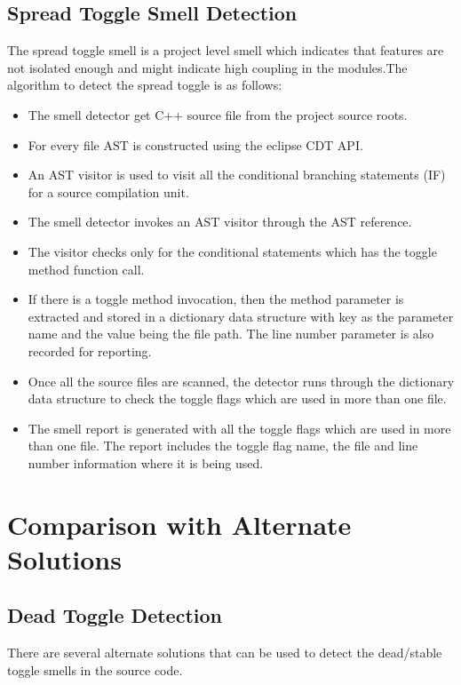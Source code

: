 \documentclass[conference]{IEEEtran}
\begin{document}
\subsection{Spread Toggle Smell Detection}
The spread toggle smell is a project level smell which indicates that features are not isolated enough and might indicate high coupling in the modules.The algorithm to detect the spread toggle is as follows: 
\begin{itemize}
	\item The smell detector get C++ source file from the project source roots.
	\item For every file AST is constructed using the eclipse CDT API.
	\item An AST visitor is used to visit all the conditional branching statements (IF) for a source compilation unit.
	\item The smell detector invokes an AST visitor through the AST reference.
	\item The visitor checks only for the conditional statements which has the toggle method function call.
	\item If there is a toggle method invocation, then the method parameter is extracted and stored in a dictionary data structure with key as the parameter name and the value being the file path. The line number parameter is also recorded for reporting.
	\item Once all the source files are scanned, the detector runs through the dictionary data structure to check the toggle flags which are used in more than one file.
	\item The smell report is generated with all the toggle flags which are used in more than one file. The report includes the toggle flag name, the file and line number information where it is being used.
\end{itemize}
\section{Comparison with Alternate Solutions}
\label{comparison-with-alternate-solutions}
\subsection{Dead Toggle Detection}
There are several alternate solutions that can be used to detect the dead/stable toggle smells in the source code.
\end{document}
